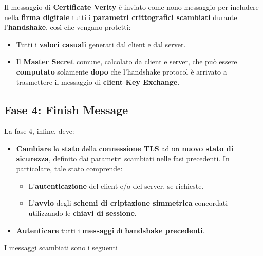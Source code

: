 \begin{remark}
Il messaggio di \textbf{Certificate Verity} è inviato come nono messaggio per includere nella \textbf{firma digitale} tutti i \textbf{parametri crittografici scambiati} durante l'\textbf{handshake}, così che vengano protetti:
\begin{itemize}
    \item Tutti i \textbf{valori casuali} generati dal client e dal server.
    \item Il \textbf{Master Secret} comune, calcolato da client e server, che può essere \textbf{computato} solamente \textbf{dopo} che l'handshake protocol è arrivato a trasmettere il messaggio di \textbf{client Key Exchange}.
\end{itemize}
\end{remark}
\subsection{Fase 4: Finish Message}
La fase 4, infine, deve:
\begin{proposition}[Phase 4]\label{prop:phase4}
\begin{itemize}
    \item \textbf{Cambiare} lo \textbf{stato} della \textbf{connessione TLS} ad un \textbf{nuovo stato di sicurezza}, definito dai parametri scambiati nelle fasi precedenti. In particolare, tale stato comprende:
    \begin{itemize}
        \item L'\textbf{autenticazione} del client e/o del server, se richieste.
        \item L'\textbf{avvio} degli \textbf{schemi di criptazione simmetrica} concordati utilizzando le \textbf{chiavi di sessione}.
    \end{itemize}
    \item \textbf{Autenticare} tutti i \textbf{messaggi} di \textbf{handshake precedenti}.
\end{itemize}
\end{proposition}
I messaggi scambiati sono i seguenti
